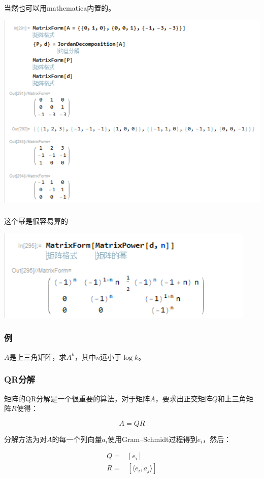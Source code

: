 \documentclass[10pt]{beamer}
\begin{document}
	\begin{frame}
		\frametitle{}
	
		当然也可以用mathematica内置的。
	
		\begin{center}
			\includegraphics[width=\textwidth]{4.PNG}
		\end{center}	
	
	\end{frame}	
	\begin{frame}
		\frametitle{}
	
		这个幂是很容易算的

		\begin{center}
			\includegraphics[width=\textwidth]{5.PNG}
		\end{center}	
	
	\end{frame}
	\begin{frame}
		\frametitle{例}
	
		$A$是上三角矩阵，求$A^k$，其中$n$远小于$\log k$。
	
	\end{frame}
	\begin{frame}
		\frametitle{QR分解}
	
		矩阵的QR分解是一个很重要的算法，对于矩阵$A$，要求出正交矩阵$Q$和上三角矩阵$R$使得：

		$$
		A=QR
		$$

		分解方法为对$A$的每一个列向量$a_i$使用Gram–Schmidt过程得到$e_i$，然后：

		$$
		\begin{aligned}
			Q=&[e_i]\\
			R=&[\langle e_i,a_j\rangle]
		\end{aligned}
		$$
	
	\end{frame}
\end{document}
